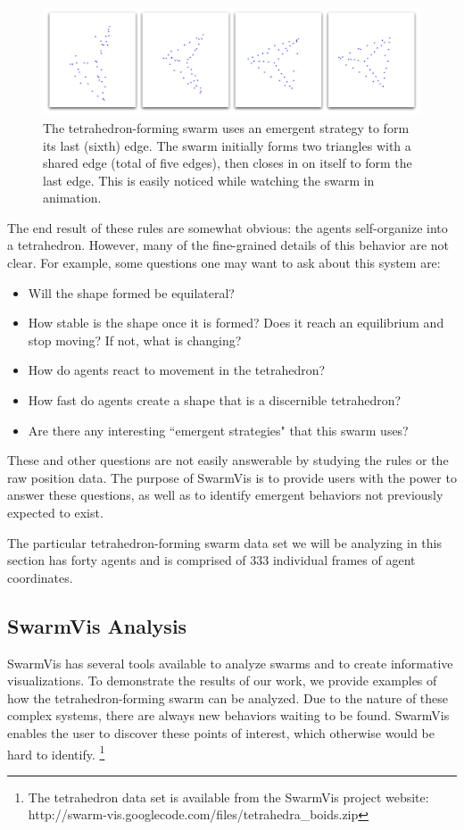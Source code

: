 \documentclass{vgtc}
\begin{document}
\begin{figure}[ht]
\centering
\includegraphics[scale=.3]{images/tetraclosing.pdf}
\caption{
The tetrahedron-forming swarm uses an emergent strategy to form its last (sixth) edge.
The swarm initially forms two triangles with a shared edge (total of five edges), then
closes in on itself to form the last edge. This is easily noticed while watching the swarm in animation.}
\label{TetraClosing}
\end{figure}

The end result of these rules are somewhat obvious: the agents self-organize into a tetrahedron.
However, many of the fine-grained details of this behavior are not clear.
For example, some questions one may want to ask about this system are: 
\begin{itemize}
\item Will the shape formed be equilateral?
\item How stable is the shape once it is formed? Does it reach an equilibrium and stop moving? If not, what is changing?
\item How do agents react to movement in the tetrahedron?
\item How fast do agents create a shape that is a discernible tetrahedron?
\item Are there any interesting ``emergent strategies" that this swarm uses?
\end{itemize}
These and other questions are not easily answerable by studying the rules or the raw position data.
The purpose of SwarmVis is to provide users with the power to answer these questions,
as well as to identify emergent behaviors not previously expected to exist.

The particular tetrahedron-forming swarm data set we will be analyzing in this section has forty agents
and is comprised of 333 individual frames of agent coordinates.



\subsection{SwarmVis Analysis}
SwarmVis has several tools available to analyze swarms and to create informative visualizations.
To demonstrate the results of our work, we provide examples of how the tetrahedron-forming swarm can be analyzed.
Due to the nature of these complex systems, there are always new behaviors waiting to be found.
SwarmVis enables the user to discover these points of interest, which otherwise would be hard to identify.
\footnote{The tetrahedron
data set is available from the SwarmVis project website: http://swarm-vis.googlecode.com/files/tetrahedra\_boids.zip}
\end{document}
